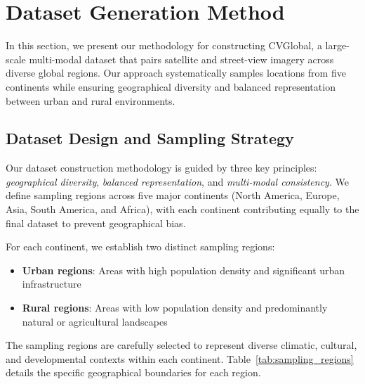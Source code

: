 \documentclass{bmvc2k}
\begin{document}
\section{Dataset Generation Method}
\label{sec:dataset_generation}

In this section, we present our methodology for constructing CVGlobal, a large-scale multi-modal dataset that pairs satellite and street-view imagery across diverse global regions. Our approach systematically samples locations from five continents while ensuring geographical diversity and balanced representation between urban and rural environments.

\subsection{Dataset Design and Sampling Strategy}

Our dataset construction methodology is guided by three key principles: \textit{geographical diversity}, \textit{balanced representation}, and \textit{multi-modal consistency}. We define sampling regions across five major continents (North America, Europe, Asia, South America, and Africa), with each continent contributing equally to the final dataset to prevent geographical bias.

For each continent, we establish two distinct sampling regions:
\begin{itemize}
    \item \textbf{Urban regions}: Areas with high population density and significant urban infrastructure
    \item \textbf{Rural regions}: Areas with low population density and predominantly natural or agricultural landscapes
\end{itemize}

The sampling regions are carefully selected to represent diverse climatic, cultural, and developmental contexts within each continent. Table~\ref{tab:sampling_regions} details the specific geographical boundaries for each region.
\end{document}
